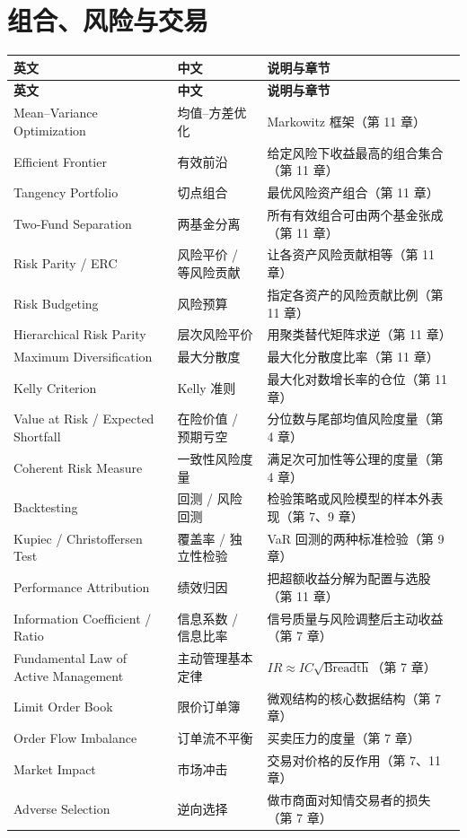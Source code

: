 \section{组合、风险与交易}

{\tablefont
\begin{longtable}{@{}L{4.6cm}L{3.6cm}L{6.6cm}@{}}
\toprule
\textbf{英文} & \textbf{中文} & \textbf{说明与章节} \\
\midrule
\endfirsthead
\toprule
\textbf{英文} & \textbf{中文} & \textbf{说明与章节} \\
\midrule
\endhead
\bottomrule
\endlastfoot
Mean--Variance Optimization & 均值--方差优化 & Markowitz 框架（第 11 章） \\
Efficient Frontier & 有效前沿 & 给定风险下收益最高的组合集合（第 11 章） \\
Tangency Portfolio & 切点组合 & 最优风险资产组合（第 11 章） \\
Two-Fund Separation & 两基金分离 & 所有有效组合可由两个基金张成（第 11 章） \\
Risk Parity / ERC & 风险平价 / 等风险贡献 & 让各资产风险贡献相等（第 11 章） \\
Risk Budgeting & 风险预算 & 指定各资产的风险贡献比例（第 11 章） \\
Hierarchical Risk Parity & 层次风险平价 & 用聚类替代矩阵求逆（第 11 章） \\
Maximum Diversification & 最大分散度 & 最大化分散度比率（第 11 章） \\
Kelly Criterion & Kelly 准则 & 最大化对数增长率的仓位（第 11 章） \\
Value at Risk / Expected Shortfall & 在险价值 / 预期亏空 & 分位数与尾部均值风险度量（第 4 章） \\
Coherent Risk Measure & 一致性风险度量 & 满足次可加性等公理的度量（第 4 章） \\
Backtesting & 回测 / 风险回测 & 检验策略或风险模型的样本外表现（第 7、9 章） \\
Kupiec / Christoffersen Test & 覆盖率 / 独立性检验 & VaR 回测的两种标准检验（第 9 章） \\
Performance Attribution & 绩效归因 & 把超额收益分解为配置与选股（第 11 章） \\
Information Coefficient / Ratio & 信息系数 / 信息比率 & 信号质量与风险调整后主动收益（第 7 章） \\
Fundamental Law of Active Management & 主动管理基本定律 & $IR\approx IC\sqrt{\text{Breadth}}$（第 7 章） \\
Limit Order Book & 限价订单簿 & 微观结构的核心数据结构（第 7 章） \\
Order Flow Imbalance & 订单流不平衡 & 买卖压力的度量（第 7 章） \\
Market Impact & 市场冲击 & 交易对价格的反作用（第 7、11 章） \\
Adverse Selection & 逆向选择 & 做市商面对知情交易者的损失（第 7 章） \\
\end{longtable}
}

